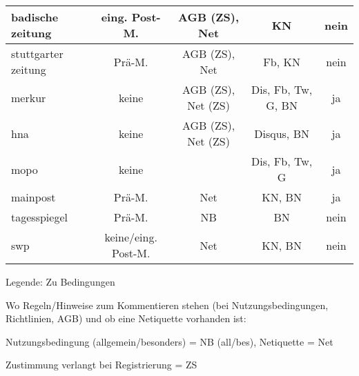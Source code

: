 \begin{landscape}
\begin{longtable}{l|cccc}
badische zeitung	& eing. Post-M.		& AGB (ZS), Net			& KN 							& nein \tabularnewline \hline
stuttgarter zeitung	& Prä-M.		& AGB (ZS), Net			& Fb, KN 						& nein \tabularnewline \hline
merkur			& keine			& AGB (ZS), Net (ZS)		& Dis, Fb, Tw, G, BN 					& ja \tabularnewline \hline
hna			& keine			& AGB (ZS), Net (ZS)		& Disqus, BN 						& ja \tabularnewline \hline
mopo			& keine			&				& Dis, Fb, Tw, G 					& ja \tabularnewline \hline
mainpost		& Prä-M.		& Net				& KN, BN 						& ja \tabularnewline \hline
tagesspiegel		& Prä-M.		& NB				& BN 							& nein \tabularnewline \hline
swp			& keine/eing. Post-M.	& Net				& KN, BN 						& nein \tabularnewline \hline


\end{longtable}
\end{landscape}

Legende: Zu Bedingungen

Wo Regeln/Hinweise zum Kommentieren stehen (bei Nutzungsbedingungen, Richtlinien, AGB) und ob eine Netiquette vorhanden ist:

Nutzungsbedingung (allgemein/besonders) = NB (all/bes), Netiquette = Net

Zustimmung verlangt bei Registrierung = ZS
